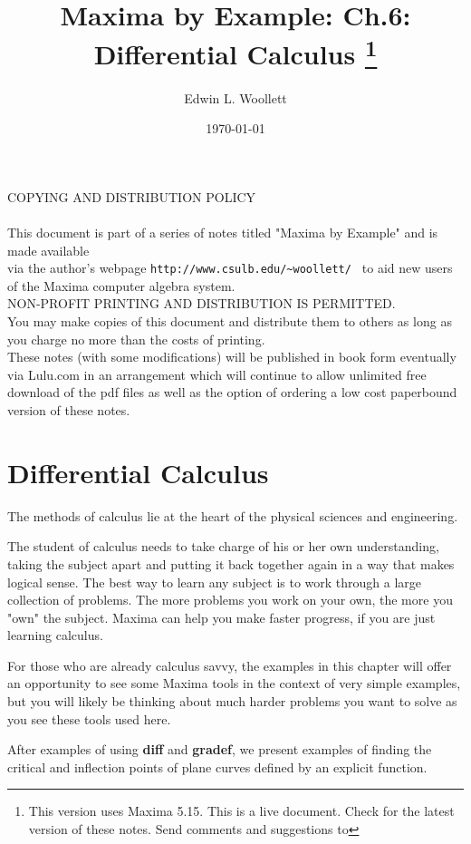\documentclass[12pt]{article}
\title{Maxima by Example: Ch.6: Differential Calculus 
            \thanks{This version uses Maxima 5.15. This is a live
            document. Check \;  \tedhome \; for the latest version of these notes. Send comments and
			 suggestions to \tedmail } }
\author{Edwin L. Woollett}
\date{\today}
\begin{document}
\small
\maketitle
\tableofcontents
{}
\newpage
\normalsize
COPYING AND DISTRIBUTION POLICY\\
\\    
	
    
    This document is part of a series of notes titled
    "Maxima by Example" and	is made available\\
	via the author's webpage 
	\verb|http://www.csulb.edu/~woollett/ | to aid
	new users of the Maxima computer algebra system.\\
	
	\smallskip
	NON-PROFIT PRINTING AND DISTRIBUTION IS PERMITTED.\\
	You may make copies of this document and distribute them to others
	as long as you charge no more than the costs of printing.\\
	
	\smallskip
	These notes (with some modifications) will be published in book form
	eventually via Lulu.com in an arrangement which will continue
	to allow unlimited free download of the pdf files as well as the option
	of ordering a low cost paperbound version of these notes.
\newpage

\setcounter{section}{5}

\section{Differential Calculus}
The methods of calculus lie at the heart of the physical sciences and engineering.

\smallskip
The student of calculus needs to take charge of his or her own understanding, taking the
  subject apart and putting it back together again in a way that makes logical sense.
The best way to learn any subject is to work through a large collection of problems.
The more problems you work on your own, the more you "own" the subject.
Maxima can help you make faster progress, if you are just learning calculus.

\smallskip
For those who are already calculus savvy, the examples in this chapter will offer
  an opportunity to see some Maxima tools in the context of very simple
  examples, but you will likely be thinking about much harder problems you want to
  solve as you see these tools used here.

\smallskip
After examples of using \textbf{diff} and \textbf{gradef}, we present examples of
  finding the critical and inflection points of plane curves defined by an explicit
  function.
\end{document}
